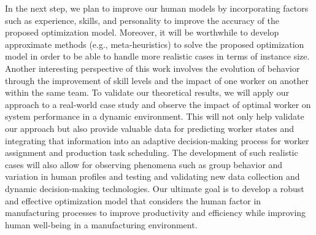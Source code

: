 \documentclass[review,12pt, 3p, times]{elsarticle}
\begin{document}
In the next step, we plan to improve our human  models by incorporating factors such as experience, skills, and personality to improve the accuracy of the proposed optimization model.
Moreover, it will be worthwhile to develop approximate methods (e.g., meta-heuristics) to solve the proposed optimization model in order to be able to handle more realistic cases in terms of instance size.
Another interesting perspective of this work involves the evolution of behavior through the improvement of skill levels and the impact of one worker on another within the same team.
To validate our theoretical results, we will apply our approach to a real-world case study and observe the impact of optimal worker  on system performance in a dynamic environment. This will not only help validate our approach but also provide valuable data for predicting worker states and integrating that information into an adaptive decision-making process for worker assignment and production task scheduling. The development of such realistic cases will also allow for observing phenomena such as group behavior and variation in human profiles and testing and validating new data collection and dynamic decision-making technologies.
Our ultimate goal is to develop a robust and effective optimization model that considers the human factor in manufacturing processes to improve productivity and efficiency while improving human well-being in a manufacturing environment.
	

 
%  
 

% 
\end{document}
